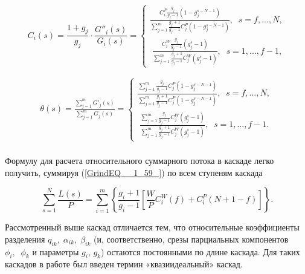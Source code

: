\begin{equation} \label{GrindEQ__1_60_} 
C_{i} (s)=\frac{1+g_{j} }{g_{j} } \cdot \frac{G''_{i} (s)}{G_{i} (s)} =\left\{\begin{array}{l} {\frac{C_{i}^{P} \frac{g_{j} }{g_{j} -1} \left(1-g_{j}^{s-N-1} \right)}{\sum _{j=1}^{m}\frac{g_{j} +1}{g_{j} -1}  C_{j}^{P} \left(1-g_{j}^{s-N-1} \right)} ,\; \; s=f,...,N,} \\ {\; \frac{C_{i}^{W} \frac{g_{j} }{g_{j} -1} \left(g_{j}^{s} -1\right)}{\sum _{j=1}^{m}\frac{g_{j} +1}{g_{j} -1}  C_{j}^{W} \left(g_{j}^{s} -1\right)} ,\; \; s=1,...,f-1,} \end{array}\right.  
\end{equation} 

\begin{equation} \label{GrindEQ__1_61_} 
\begin{array}{l} {\theta (s)=\frac{\sum _{j=1}^{m}G'_{j} (s) }{\sum _{j=1}^{m}G_{j} (s) } =\left\{\begin{array}{l} {\frac{\sum _{j=1}^{m}\frac{g_{j} }{g_{j} -1} C_{j}^{P} \left(1-g_{j}^{s-N-1} \right) }{\sum _{j=1}^{m}\frac{g_{j} +1}{g_{j} -1}  C_{j}^{P} \left(1-g_{j}^{s-N-1} \right)} ,\; \; s=f,...,N,} \\ {\; \frac{\sum _{j=1}^{m}\frac{g_{j} }{g_{j} -1} C_{j}^{W} \left(g_{j}^{s} -1\right) }{\sum _{j=1}^{m}\frac{g_{j} +1}{g_{j} -1}  C_{j}^{W} \left(g_{j}^{s} -1\right)} ,\; \; s=1,...,f-1.} \end{array}\right. } \\ {\; } \end{array} 
\end{equation}

Формулу для расчета относительного суммарного потока в каскаде легко получить, суммируя (\ref{GrindEQ__1_59_}) по всем ступеням каскада

\begin{equation} \label{GrindEQ__1_62_} 
  \sum _{s=1}^{N}\frac{L(s)}{P} =\sum _{i=1}^{m}\left\{\frac{g_{i} +1}{g_{i} -1} \left[\frac{W}{P} C_{i}^{W} (f)+C_{i}^{P} \left(N+1-f\right)\right]\right\}  .   
\end{equation} 
  
Рассмотренный выше каскад отличается тем, что относительные коэффициенты разделения $q_{ik} ,\; \alpha _{ik} ,\; \beta _{ik} $ (и, соответственно, срезы парциальных компонентов $\phi _{i} ,\; \; \phi _{k} $ и параметры $g_{i} $, $g_{k} $) остаются постоянными по длине каскада. Для таких каскадов в работе \cite{sazykinKvaziidealnyeKaskadyDlya2000} был введен термин «квазиидеальный» каскад.

